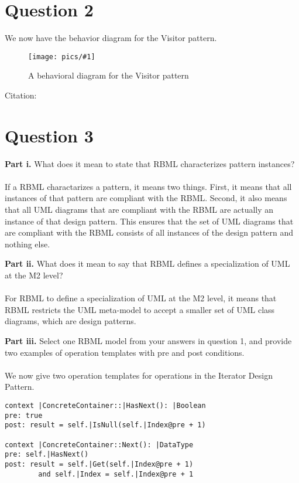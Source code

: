 \documentclass{article}
\newcommand{\fig}[3]{ 
	\begin{figure}[h]
		\centering
		\caption{#3}
		\texttt{[image: pics/\#1]}
		\label{fig:#1}
	\end{figure} 
}
\begin{document}
\section*{Question 2}
We now have the behavior diagram for the Visitor pattern.

\fig{visitor-ips}{.95}{A behavioral diagram for the Visitor pattern}
Citation: 
\newpage

\section*{Question 3}

{\bf Part i.} 
What does it mean to state that RBML characterizes pattern instances? \\\\
If a RBML charactarizes a pattern, it means two things. First, it means that all instances of that pattern are compliant with the RBML. Second, it also means that all UML diagrams that are compliant with the RBML are actually an instance of that design pattern. This ensures that the set of UML diagrams that are compliant with the RBML consists of all instances of the design pattern and nothing else.
\newline

\noindent
{\bf Part ii.} 
What does it mean to say that RBML defines a specialization of UML at the M2 level? \\\\
For RBML to define a specialization of UML at the M2 level, it means that RBML restricts the UML meta-model to accept a smaller set of UML class diagrams, which are design patterns.
\newline

\noindent
{\bf Part iii.} 
Select one RBML model from your answers in question 1, and provide two examples of
operation templates with pre and post conditions. \\\\
We now give two operation templates for operations in the Iterator Design Pattern.

\begin{Verbatim}
context |ConcreteContainer::|HasNext(): |Boolean
pre: true
post: result = self.|IsNull(self.|Index@pre + 1)
		
context |ConcreteContainer::Next(): |DataType
pre: self.|HasNext()
post: result = self.|Get(self.|Index@pre + 1)
		and self.|Index = self.|Index@pre + 1
\end{Verbatim}
\newpage


\end{document}
